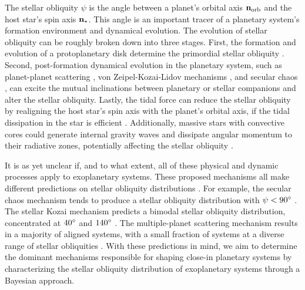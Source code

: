 \documentclass[twocolumn,times]{aastex631}
\begin{document}
The stellar obliquity $\psi$ is the angle between a planet's orbital axis $\bf{n}_{\rm orb}$ and the host star's spin axis $\bf{n}_{\star}$. 
This angle is an important tracer of a planetary system's formation environment and dynamical evolution. The evolution of stellar obliquity can be roughly broken down into three stages. First, the formation and evolution of a protoplanetary disk determine the primordial stellar obliquity \citep[e.g.,][]{Bate10, Lai11, Batygin12}. Second, post-formation dynamical evolution in the planetary system, such as planet-planet scattering \citep[e.g.,][]{Rasio96, Chatterjee08, Nagasawa08, Beague12}, von Zeipel-Kozai-Lidov mechanisms \citep[e.g.,][]{Wu03, Naoz16}, and secular chaos \citep{Wu11}, can excite the mutual inclinations between planetary or stellar companions and alter the stellar obliquity. Lastly, the tidal force can reduce the stellar obliquity by realigning the host star's spin axis with the planet's orbital axis, if the tidal dissipation in the star is efficient \citep[e.g.,][]{Winn10, Albrecht12}. Additionally, massive stars with convective cores could generate internal gravity waves and dissipate angular momentum to their radiative zones, potentially affecting the stellar obliquity \citep{Rogers12, Rogers13}.

It is as yet unclear if, and to what extent, all of these physical and dynamic processes apply to exoplanetary systems. These proposed mechanisms all make different predictions on stellar obliquity distributions \citep[see][and references therein]{Albrecht22}. For example, the secular chaos mechanism tends to produce a stellar obliquity distribution with $\psi < 90\mbox{$^\circ$}$ \citep[e.g.,][]{Teyssandier19}. The stellar Kozai mechanism predicts a bimodal stellar obliquity distribution, concentrated at $40\mbox{$^\circ$}$ and $140\mbox{$^\circ$}$ \citep[e.g.,][]{Fabrycky07, Anderson16, Vick19}. The multiple-planet scattering mechanism results in a majority of aligned systems, with a small fraction of systems at a diverse range of stellar obliquities \citep[e.g.,][]{Beague12}. 
With these predictions in mind, we aim to determine the dominant mechanisms responsible for shaping close-in planetary systems by characterizing the stellar obliquity distribution of exoplanetary systems through a Bayesian approach.
\end{document}
